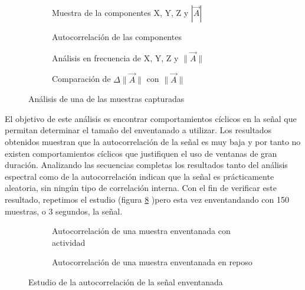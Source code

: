 \begin{figure}[htb!]
  \centering
  \begin{subfigure}[b]{0.48\textwidth}
      \centering
      \caption{Muestra de la componentes X, Y, Z y $|\vec{A}|$}
      \label{fig:dataset:xyzmodsample}
  \end{subfigure}
  \hfill
  \begin{subfigure}[b]{0.48\textwidth}
      \centering
      \caption{Autocorrelación de las componentes}
      \label{fig:dataset:autocorrsample}
  \end{subfigure}
  \begin{subfigure}[b]{0.48\textwidth}
    \centering
    \caption{Análisis en frecuencia de X, Y, Z y $\|\vec{A}\|$}
    \label{fig:dataset:fftsample}
  \end{subfigure}
  \hfill
  \begin{subfigure}[b]{0.48\textwidth}
    \centering
    \caption{Comparación de $\Delta\|\vec{A}\|$ con $\|\vec{A}\|$}
    \label{fig:dataset:accelsample}
  \end{subfigure}
  \caption{\label{fig:dataset:samples} Análisis de una de las muestras capturadas}
\end{figure}

El objetivo de este análisis es encontrar comportamientos cíclicos en la señal que permitan determinar el tamaño del enventanado a utilizar. Los resultados obtenidos muestran que la autocorrelación de la señal es muy baja y por tanto no existen comportamientos cíclicos que justifiquen el uso de ventanas de gran duración. Analizando las secuencias completas los resultados tanto del análisis espectral como de la autocorrelación indican que la señal es prácticamente aleatoria, sin ningún tipo de correlación interna. Con el fin de verificar este resultado, repetimos el estudio (figura \ref{fig:dataset:sub:autocor} )pero esta vez enventandando con 150 muestras, o 3 segundos, la señal.

\begin{figure}[htb!]
  \centering
  \begin{subfigure}[b]{0.48\textwidth}
      \centering
      \caption{Autocorrelación de una muestra enventanada con actividad}
      \label{fig:dataset:sub:autocorlow}
  \end{subfigure}
  \hfill
  \begin{subfigure}[b]{0.48\textwidth}
      \centering
      \caption{Autocorrelación de una muestra enventanada en reposo}
      \label{fig:dataset:sub:autocorhigh}
  \end{subfigure}
  \caption{\label{fig:dataset:sub:autocor} Estudio de la autocorrelación de la señal enventanada}

\end{figure}

